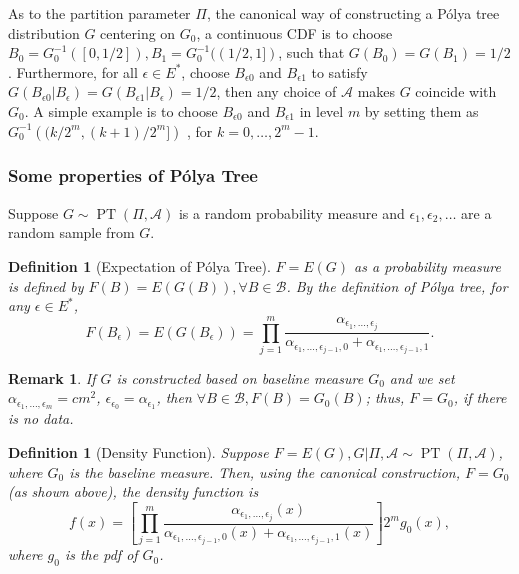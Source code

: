 \documentclass[12pt]{article}
\newtheorem{deff}[thm]{Definition}
\newtheorem{rmk}[thm]{Remark}
\newcommand{\polya}{P\'{o}lya}
\DeclareMathOperator{\pt}{PT}
\begin{document}
As to the partition parameter $\Pi$, the canonical way of constructing
a \polya{} tree distribution $G$ centering on $G_0$, a continuous CDF
is to choose $B_0 = G^{-1}_0 ([0, 1/2]), B_1 = G^{-1}_0 ((1/2,1])$,
such that $G(B_0) = G(B_1)= 1/2$. Furthermore, for all $\epsilon \in
E^{*}$, choose $B_{\epsilon 0 }$ and $B_{\epsilon 1}$ to satisfy
$G(B_{\epsilon 0 } |B_{\epsilon} ) = G(B_{\epsilon 1} | B_{\epsilon})
= 1/2 $, then any choice of $\mathcal{A} $ makes $G$ coincide with
$G_0$. A simple example is to choose $B_{\epsilon 0} $ and
$B_{\epsilon 1}$ in level $m$ by setting them as $G^{-1}_0 \left(
  (k/2^m, (k+1)/2^m] \right)$ , for $k=0, \ldots, 2^m-1$.

\subsubsection{Some properties of \polya{} Tree}
Suppose $G \sim \pt (\Pi, \mathcal{A})$ is a random probability
measure and $\epsilon_1, \epsilon_2, \ldots$ are a random sample from $G$.

\begin{deff}[Expectation of \polya{} Tree]
  $F= E(G)$ as a probability measure is defined by $F(B) = E(G(B)),
  \forall B \in \mathcal{B}$. By the definition of \polya{} tree, for any
  $\epsilon \in E^{*}$,
  \begin{displaymath}
    F(B_{\epsilon})  = E(G(B_{\epsilon})) = \prod_{j=1}^m
    \frac{\alpha_{\epsilon_1, \ldots, \epsilon_j}}{\alpha_{\epsilon_1,
        \ldots, \epsilon_{j-1},0} + \alpha_{\epsilon_1, \ldots, \epsilon_{j-1},1}}.
  \end{displaymath}
\end{deff}

\begin{rmk}
  If $G$ is constructed based on baseline measure $G_0$ and we set
  $\alpha_{\epsilon_1, \ldots, \epsilon_m} = cm^2 $,
  $\epsilon_{\epsilon_0 }= \alpha_{\epsilon_1}$, then $\forall B \in
  \mathcal{B}, F(B) = G_0(B)$; thus, $F=G_0$, if there is no
  data.
\end{rmk}

\begin{deff}[Density Function]
  Suppose $F=E(G), G|\Pi, \mathcal{A} \sim \pt (\Pi, \mathcal{A})$,
  where $G_0 $ is the baseline measure. Then, using the canonical
  construction, $F=G_0$ (as shown above), the density function is
  \begin{equation}\label{eq:3}
    f(x) = \left[ \prod_{j=1}^m \frac{ \alpha_{\epsilon_1, \ldots,
          \epsilon_j}(x)}{\alpha_{\epsilon_1, \ldots, \epsilon_{j-1},0}(x)
        + \alpha_{\epsilon_1, \ldots, \epsilon_{j-1},1}(x)} \right] 2^{m } g_0(x),
  \end{equation}
  where $g_0$ is the pdf of $G_0$.
\end{deff}
\end{document}
